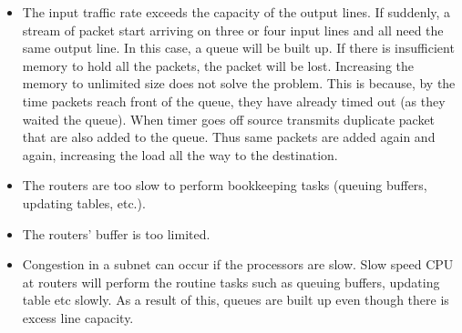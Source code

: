 \documentclass[twoside]{article}
\begin{document}
\begin{itemize}
    \item The input traffic rate exceeds the capacity of the output lines. If suddenly, a stream of packet start arriving on three or four input lines and all need the same output line. In this case, a queue will be built up. If there is insufficient memory to hold all the packets, the packet will be lost. Increasing the memory to unlimited size does not solve the problem. This is because, by the time packets reach front of the queue, they have already timed out (as they waited the queue). When timer goes off source transmits duplicate packet that are also added to the queue. Thus same packets are added again and again, increasing the load all the way to the destination.
    \item The routers are too slow to perform bookkeeping tasks (queuing buffers, updating tables, etc.).
    \item The routers' buffer is too limited.
    \item Congestion in a subnet can occur if the processors are slow. Slow speed CPU at routers will perform the routine tasks such as queuing buffers, updating table etc slowly. As a result of this, queues are built up even though there is excess line capacity.
    
\end{itemize}
\\
\\
\end{document}
